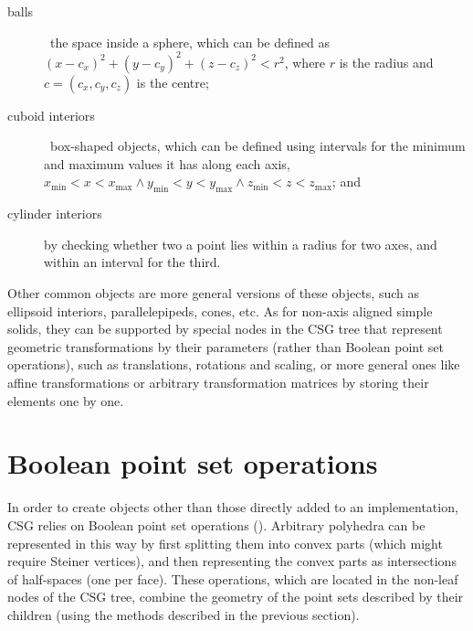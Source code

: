 \begin{description}
\item[balls] \ie\ the space inside a sphere, which can be defined as \( (x-c_x)^2 + (y-c_y)^2 + (z-c_z)^2 < r^2\), where \(r\) is the radius and \(c = (c_x, c_y, c_z)\) is the centre;
\item[cuboid interiors] \ie\ box-shaped objects, which can be defined using intervals for the minimum and maximum values it has along each axis, \ie\ \( x_\mathrm{min} < x < x_\mathrm{max} \wedge y_\mathrm{min} < y < y_\mathrm{max} \wedge z_\mathrm{min} < z < z_\mathrm{max} \); and
\item[cylinder interiors] by checking whether two a point lies within a radius for two axes, and within an interval for the third.
\end{description}

Other common objects are more general versions of these objects, such as ellipsoid interiors, parallelepipeds, cones, etc.
As for non-axis aligned simple solids, they can be supported by special nodes in the CSG tree that represent geometric transformations by their parameters (rather than Boolean point set operations), such as translations, rotations and scaling, or more general ones like affine transformations or arbitrary transformation matrices by storing their elements one by one.

\section{Boolean point set operations}

In order to create objects other than those directly added to an implementation, CSG relies on Boolean point set operations ().
Arbitrary polyhedra can be represented in this way by first splitting them into convex parts (which might require Steiner vertices), and then representing the convex parts as intersections of half-spaces (one per face).
These operations, which are located in the non-leaf nodes of the CSG tree, combine the geometry of the point sets described by their children (using the methods described in the previous section).

